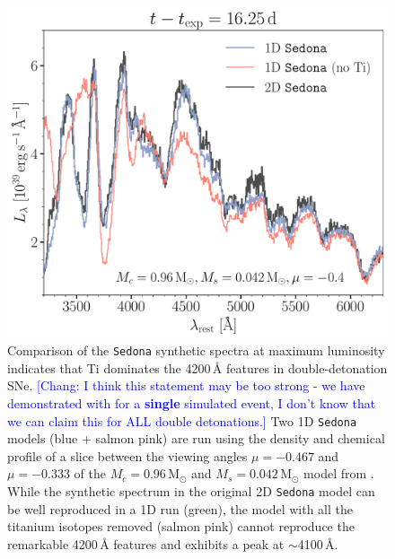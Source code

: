 \documentclass[twocolumn]{aastex631}
\newcommand{\chang}[1]{\textcolor{blue}{[Chang: #1]}}
\begin{document}
\begin{CJK*}{UTF8}{gbsn}
\begin{figure}
    \centering
    \includegraphics[width=\linewidth]{Ti_II.pdf}
    \caption{Comparison of the \texttt{Sedona} synthetic spectra at maximum luminosity indicates that Ti dominates the 4200\,\r{A} features in double-detonation SNe. \chang{I think this statement may be too strong - we have demonstrated with for a \textbf{single} simulated event, I don't know that we can claim this for ALL double detonations.} Two 1D \texttt{Sedona} models (blue + salmon pink) are run using the density and chemical profile of a slice between the viewing angles $\mu=-0.467$ and $\mu=-0.333$ of the $M_c=0.96\,\mathrm{M_\odot}$ and $M_s=0.042\,\mathrm{M_\odot}$ model from \citet{Boos_2021}. While the synthetic spectrum in the original 2D \texttt{Sedona} model can be well reproduced in a 1D run (green), the model with all the titanium isotopes removed (salmon pink) cannot reproduce the remarkable 4200\,\r{A} features and exhibits a peak at $\sim$4100\,\r{A}.}
    \label{fig:Ti}
\end{figure}

\end{CJK*}
\end{document}
